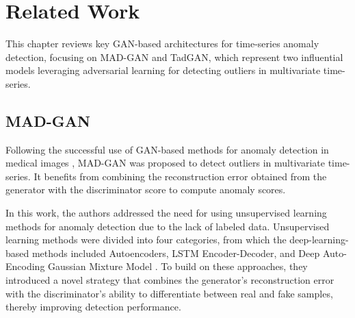 \chapter{Related Work}
\label{chap:03-related-work}

This chapter reviews key GAN-based architectures for time-series anomaly detection, focusing on MAD-GAN and TadGAN, which represent two influential models leveraging adversarial learning for detecting outliers in multivariate time-series.

\section{MAD-GAN}
\label{sec:mad-gan}
Following the successful use of GAN-based methods for anomaly detection in medical images \cite{schlegl2019f-anogan}, MAD-GAN was proposed to detect outliers in multivariate time-series. It benefits from combining the reconstruction error obtained from the generator with the discriminator score to compute anomaly scores.

In this work, the authors addressed the need for using unsupervised learning methods for anomaly detection due to the lack of labeled data. Unsupervised learning methods were divided into four categories, from which the deep-learning-based methods included Autoencoders, LSTM Encoder-Decoder, and Deep Auto-Encoding Gaussian Mixture Model \cite{li2019madgan}. To build on these approaches, they introduced a novel strategy that combines the generator's reconstruction error with the discriminator's ability to differentiate between real and fake samples, thereby improving detection performance.

